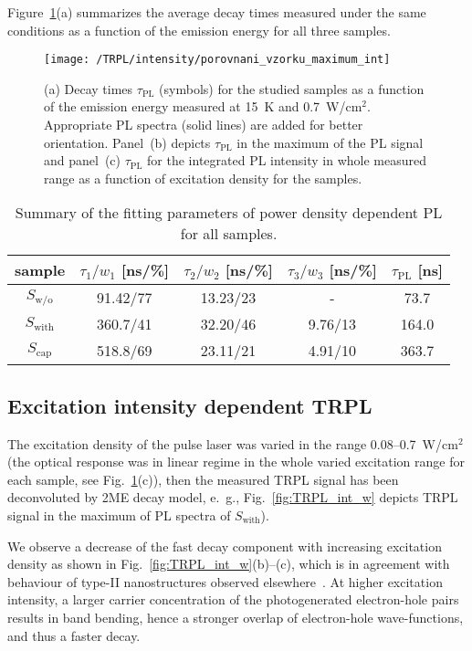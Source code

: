 Figure~\ref{fig:TRPL_int_all}(a) summarizes the average decay times measured under the same conditions as a function of the emission energy for all three samples. 
%
\begin{figure}
\centering
\texttt{[image: /TRPL/intensity/porovnani\_vzorku\_maximum\_int]}
\caption{(a) Decay times $\tau_\mathrm{PL}$ (symbols) for the studied samples as a function of the emission energy measured at 15~K and 0.7~W/cm$^2$. Appropriate PL spectra (solid lines) are added for better orientation. Panel~(b) depicts $\tau_\mathrm{PL}$ in the maximum of the PL signal and panel~(c) $\tau_\mathrm{PL}$ for the integrated PL intensity in whole measured range as a function of excitation density for the samples.}
\label{fig:TRPL_int_all}
\end{figure}



\begin{table}
	\centering
	\caption{Summary of the fitting parameters of power density dependent PL for all samples.}
	\begin{tabularx}{0.9\textwidth}{cCCcc}
		\toprule
		
		sample & $\tau_1/w_1$ [ns/\%]&  $\tau_2/w_2$ [ns/\%]  & $\tau_3/w_3$ [ns/\%] & $\tau_\mathrm{PL}$ [ns] \\ 	
		\midrule
		\midrule
		$S_\mathrm{w/o}$& 91.42/77 & 13.23/23 & -& 73.7\\
		\midrule
		$S_\mathrm{with}$& 360.7/41 & 32.20/46 & 9.76/13&  164.0\\
		\midrule
		$S_\mathrm{cap}$ & 518.8/69 & 23.11/21 & 4.91/10& 363.7\\ 	
		\bottomrule
	\end{tabularx}\label{tab:TRPL_int_params}
\end{table}

\subsection{Excitation intensity dependent TRPL}
The excitation density of the pulse laser was varied in the range 0.08--0.7~W/cm$^2$ (the optical response was in linear regime in the whole varied excitation range for each sample, see Fig.~\ref{fig:TRPL_int_all}(c)), then the measured TRPL signal has been deconvoluted by 2ME decay model, e.~g., Fig.~\ref{fig:TRPL_int_w} depicts TRPL signal in the maximum of PL spectra of $S_\mathrm{with}$). 

We observe a decrease of the fast decay component with increasing excitation density as shown in Fig.~\ref{fig:TRPL_int_w}(b)--(c), which is in agreement with behaviour of type-II nanostructures observed elsewhere~\citep{Ledentsov_prb1995_intmodel,Gu_prb2005_TRPLtype2,Manna_apl2012_TRPLtype2,Zaitsev_prb2007}. At higher excitation intensity, a larger carrier concentration of the photogenerated electron-hole pairs results in band bending, hence a stronger overlap of electron-hole wave-functions, and thus a faster decay.
%


